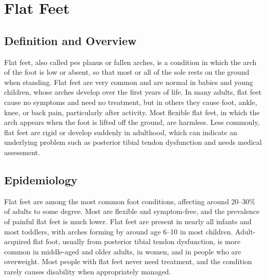 \chapter{Flat Feet}

\section*{Definition and Overview}
Flat feet, also called pes planus or fallen arches, is a condition in which the arch of the foot is low or absent, so that most or all of the sole rests on the ground when standing. Flat feet are very common and are normal in babies and young children, whose arches develop over the first years of life. In many adults, flat feet cause no symptoms and need no treatment, but in others they cause foot, ankle, knee, or back pain, particularly after activity. Most flexible flat feet, in which the arch appears when the foot is lifted off the ground, are harmless. Less commonly, flat feet are rigid or develop suddenly in adulthood, which can indicate an underlying problem such as posterior tibial tendon dysfunction and needs medical assessment.

\section*{Epidemiology}
Flat feet are among the most common foot conditions, affecting around 20--30\% of adults to some degree. Most are flexible and symptom-free, and the prevalence of painful flat feet is much lower. Flat feet are present in nearly all infants and most toddlers, with arches forming by around age 6--10 in most children. Adult-acquired flat foot, usually from posterior tibial tendon dysfunction, is more common in middle-aged and older adults, in women, and in people who are overweight. Most people with flat feet never need treatment, and the condition rarely causes disability when appropriately managed.

